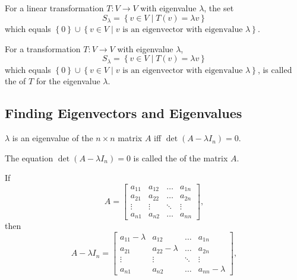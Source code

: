 \begin{theorem}
  For a linear transformation $T : V \to V$ with eigenvalue $\lambda$, the set 
  \begin{equation*}
    S_{\lambda} = \left\{v \in V \mid T(v) = \lambda v\right\}
  \end{equation*}
  which equals $\left\{0\right\} \cup \left\{v \in V \mid v \text{ is an eigenvector with eigenvalue } \lambda\right\}$.
\end{theorem}

\begin{definition}
  For a transformation $T : V \to V$ with eigenvalue $\lambda$,
  \begin{equation*}
    S_{\lambda} = \left\{v \in V \mid T(v) = \lambda v\right\}
  \end{equation*}
  which equals $\left\{0\right\} \cup \left\{v \in V \mid v \text{ is an eigenvector with eigenvalue } \lambda\right\}$, is called the  of $T$ for the eigenvalue $\lambda$.
\end{definition}

\subsection{Finding Eigenvectors and Eigenvalues}
\begin{theorem}
  $\lambda$ is an eigenvalue of the $n \times n$ matrix $A$ iff $\det(A - \lambda I_{n}) = 0$.
\end{theorem}

\begin{definition}
  The equation $\det(A - \lambda I_{n}) = 0$ is called the  of the matrix $A$.
\end{definition}

If 
\begin{equation*}
  A = \begin{bmatrix}
    a_{11} & a_{12} & \dots & a_{1n} \\
    a_{21} & a_{22} & \dots & a_{2n} \\
    \vdots & \vdots & \ddots & \vdots \\
    a_{n1} & a_{n2} & \dots & a_{nn}
  \end{bmatrix},
\end{equation*}
then 
\begin{equation*}
    A - \lambda I_{n}  =
\begin{bmatrix}
    a_{11} - \lambda & a_{12} & \dots & a_{1n} \\
    a_{21} & a_{22} - \lambda & \dots & a_{2n} \\
    \vdots & \vdots & \ddots & \vdots \\
    a_{n1} & a_{n2} & \dots & a_{nn} - \lambda
  \end{bmatrix},
\end{equation*}

